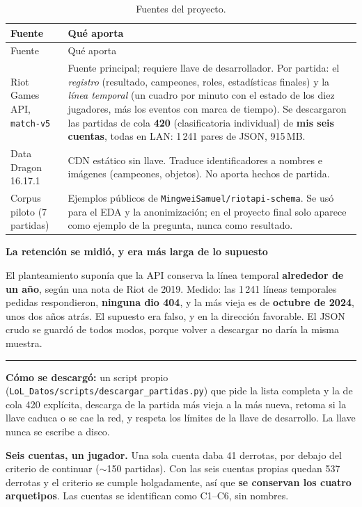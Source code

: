 \documentclass[11pt,letterpaper]{article}
\newenvironment{respuesta}[1]
  {\par\medskip\setlength{\fboxsep}{10pt}%
   \begin{lrbox}{\cajaresp}%
   \begin{minipage}{\dimexpr\linewidth-2\fboxsep-3pt\relax}%
   \color{tinta}\textcolor{azul}{\textbf{#1}}\par\smallskip\ignorespaces}
  {\end{minipage}%
   \end{lrbox}%
   \noindent\textcolor{azul}{\rule[-\dp\cajaresp]{3pt}{\dimexpr\ht\cajaresp+\dp\cajaresp\relax}}%
   \colorbox{papel}{\usebox{\cajaresp}}\par\medskip}
\begin{document}
\begin{longtable}{p{3.4cm}p{11.2cm}}
\caption{Fuentes del proyecto.}\\
\toprule
Fuente & Qué aporta \\
\midrule
\endfirsthead
\toprule
Fuente & Qué aporta \\
\midrule
\endhead
Riot Games API, \texttt{match-v5} &
Fuente principal; requiere llave de desarrollador. Por partida: el \emph{registro}
(resultado, campeones, roles, estadísticas finales) y la \emph{línea temporal} (un
cuadro por minuto con el estado de los diez jugadores, más los eventos con marca de
tiempo). Se descargaron las partidas de cola \textbf{420} (clasificatoria
individual) de \textbf{mis seis cuentas}, todas en LAN: 1\,241 pares de JSON,
915\,MB. \\
\addlinespace
Data Dragon 16.17.1 &
CDN estático sin llave. Traduce identificadores a nombres e imágenes (campeones,
objetos). No aporta hechos de partida. \\
\addlinespace
Corpus piloto (7 partidas) &
Ejemplos públicos de \texttt{MingweiSamuel/riotapi-schema}. Se usó para el EDA y la
anonimización; en el proyecto final solo aparece como ejemplo de la pregunta, nunca
como resultado. \\
\bottomrule
\end{longtable}

\begin{respuesta}{La retención se midió, y era más larga de lo supuesto}
El planteamiento suponía que la API conserva la línea temporal \textbf{alrededor de un
año}, según una nota de Riot de 2019. Medido: las 1\,241 líneas temporales pedidas
respondieron, \textbf{ninguna dio 404}, y la más vieja es de \textbf{octubre de 2024},
unos dos años atrás. El supuesto era falso, y en la dirección favorable. El JSON crudo
se guardó de todos modos, porque volver a descargar no daría la misma muestra.
\end{respuesta}

\noindent \textbf{Cómo se descargó:} un script propio
(\texttt{LoL\_Datos/scripts/descargar\_partidas.py}) que pide la lista completa y la de cola 420 explícita,
descarga de la partida más vieja a la más nueva, retoma si la llave caduca o se cae la
red, y respeta los límites de la llave de desarrollo. La llave nunca se escribe a disco.

\noindent \textbf{Seis cuentas, un jugador.} Una sola cuenta daba 41 derrotas, por
debajo del criterio de continuar (\(\sim\)150 partidas). Con las seis cuentas propias
quedan 537 derrotas y el criterio se cumple holgadamente, así que \textbf{se conservan
los cuatro arquetipos}. Las cuentas se identifican como C1--C6, sin nombres.
\end{document}
